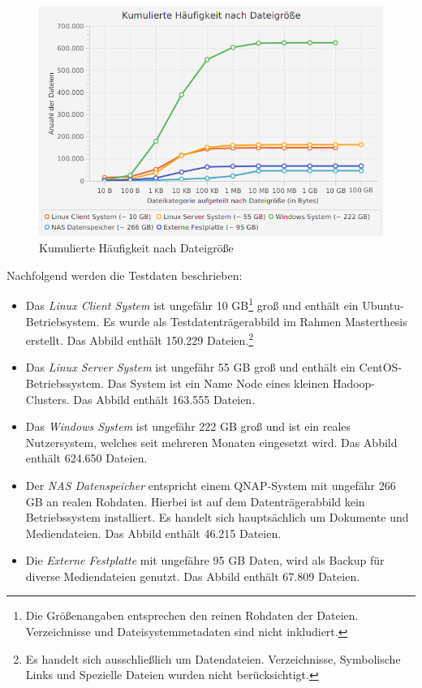  \begin{figure}[ht]
  \centering
  \includegraphics[width=\textwidth]{./resource/fileSize_cumulatedAmount.png}
  \caption{Kumulierte Häufigkeit nach Dateigröße}
  \label{fig:file_size_c_amount}
\end{figure}

\noindent
Nachfolgend werden die Testdaten beschrieben:
\begin{itemize}
\item Das \textit{Linux Client System} ist ungefähr 10 GB\footnote{Die Größenangaben entsprechen den reinen Rohdaten der Dateien. Verzeichnisse und Dateisystemmetadaten sind nicht inkludiert.} groß und enthält ein Ubuntu-Betriebsystem. Es wurde als Testdatenträgerabbild im Rahmen Masterthesis erstellt. Das Abbild enthält 150.229 Dateien.\footnote{Es handelt sich ausschließlich um Datendateien. Verzeichnisse, Symbolische Links und Spezielle Dateien wurden nicht berücksichtigt.}
\item Das \textit{Linux Server System} ist ungefähr 55 GB groß und enthält ein CentOS-Betriebssystem. Das System ist ein Name Node eines kleinen Hadoop-Clusters. Das Abbild enthält 163.555 Dateien.
\item Das \textit{Windows System} ist ungefähr 222 GB groß und ist ein reales Nutzersystem, welches seit mehreren Monaten eingesetzt wird. Das Abbild enthält 624.650 Dateien.
\item Der \textit{NAS Datenspeicher} entspricht einem QNAP-System mit ungefähr 266 GB an realen Rohdaten. Hierbei ist auf dem Datenträgerabbild kein Betriebssystem installiert. Es handelt sich hauptsächlich um Dokumente und Mediendateien. Das Abbild enthält 46.215 Dateien.
\item Die \textit{Externe Festplatte} mit ungefähre 95 GB Daten, wird als Backup für diverse Mediendateien genutzt. Das Abbild enthält 67.809 Dateien.
\end{itemize}

